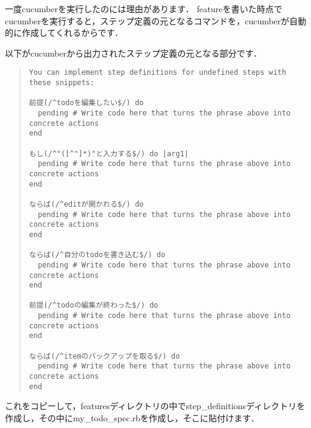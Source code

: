 一度cucumberを実行したのには理由があります．
featureを書いた時点でcucumberを実行すると，ステップ定義の元となるコマンドを，cucumberが自動的に作成してくれるからです．

以下がcucumberから出力されたステップ定義の元となる部分です．
\begin{quote}\begin{verbatim}
You can implement step definitions for undefined steps with these snippets:

前提(/^todoを編集したい$/) do
  pending # Write code here that turns the phrase above into concrete actions
end

もし(/^"([^"]*)"と入力する$/) do |arg1|
  pending # Write code here that turns the phrase above into concrete actions
end

ならば(/^editが開かれる$/) do
  pending # Write code here that turns the phrase above into concrete actions
end

ならば(/^自分のtodoを書き込む$/) do
  pending # Write code here that turns the phrase above into concrete actions
end

前提(/^todoの編集が終わった$/) do
  pending # Write code here that turns the phrase above into concrete actions
end

ならば(/^itemのバックアップを取る$/) do
  pending # Write code here that turns the phrase above into concrete actions
end
\end{verbatim}\end{quote}
これをコピーして，featuresディレクトリの中でstep\_definitionsディレクトリを作成し，その中にmy\_todo\_spec.rbを作成し，そこに貼付けます．

